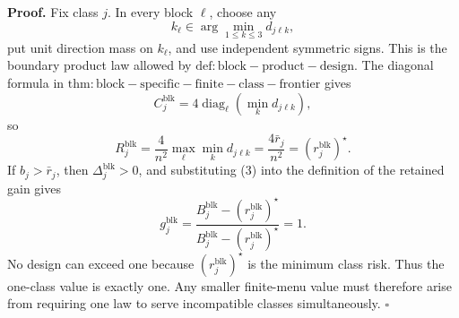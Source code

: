 \textbf{Proof.}
Fix class \(j\).  In every block \(\ell\), choose any
\[
k_\ell\in\arg\min_{1\le k\le3}d_{j\ell k}, \tag{1}
\]
put unit direction mass on \(k_\ell\), and use independent symmetric signs.  This is the boundary product law allowed by \(\mathrm{def:block-product-design}\).  The diagonal formula in \(\mathrm{thm:block-specific-finite-class-frontier}\) gives
\[
C_j^{\mathrm{blk}}
=4\operatorname{diag}_{\ell}
\left(\min_kd_{j\ell k}\right), \tag{2}
\]
so
\[
R_j^{\mathrm{blk}}
=\frac4{n^2}\max_\ell\min_kd_{j\ell k}
=\frac{4\bar r_j}{n^2}
=(r_j^{\mathrm{blk}})^\star. \tag{3}
\]
If \(b_j>\bar r_j\), then \(\Delta_j^{\mathrm{blk}}>0\), and substituting (3) into the definition of the retained gain gives
\[
g_j^{\mathrm{blk}}
=\frac{B_j^{\mathrm{blk}}-(r_j^{\mathrm{blk}})^\star}
{B_j^{\mathrm{blk}}-(r_j^{\mathrm{blk}})^\star}=1. \tag{4}
\]
No design can exceed one because \((r_j^{\mathrm{blk}})^\star\) is the minimum class risk.  Thus the one-class value is exactly one.  Any smaller finite-menu value must therefore arise from requiring one law to serve incompatible classes simultaneously. \(\square\)